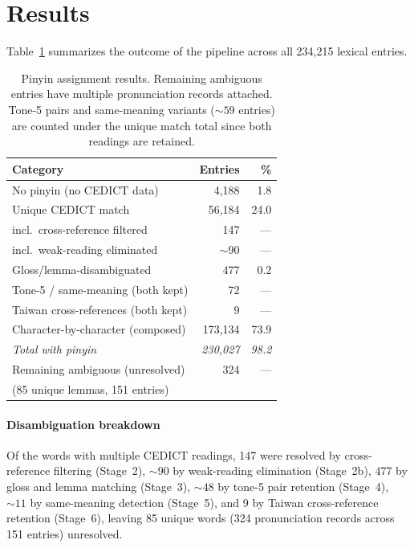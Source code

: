 \documentclass[11pt,a4paper]{article}
\begin{document}
\section{Results}

Table~\ref{tab:results} summarizes the outcome of the pipeline across
all 234,215 lexical entries.

\begin{table}[ht]
\centering
\begin{tabular}{lrr}
  \toprule
  Category & Entries & \% \\
  \midrule
  No pinyin (no CEDICT data) & 4,188 & 1.8 \\
  \midrule
  Unique CEDICT match & 56,184 & 24.0 \\
  \quad incl.\ cross-reference filtered & 147 & --- \\
  \quad incl.\ weak-reading eliminated & ${\sim}90$ & --- \\
  Gloss/lemma-disambiguated & 477 & 0.2 \\
  Tone-5 / same-meaning (both kept) & 72 & --- \\
  Taiwan cross-references (both kept) & 9 & --- \\
  Character-by-character (composed) & 173,134 & 73.9 \\
  \midrule
  \emph{Total with pinyin} & \emph{230,027} & \emph{98.2} \\
  \midrule
  Remaining ambiguous (unresolved) & 324 & --- \\
  \quad (85 unique lemmas, 151 entries) & & \\
  \bottomrule
\end{tabular}
\caption{Pinyin assignment results.  Remaining ambiguous entries have
  multiple pronunciation records attached.  Tone-5 pairs and
  same-meaning variants (${\sim}59$ entries) are counted under the
  unique match total since both readings are retained.}
\label{tab:results}
\end{table}

\paragraph{Disambiguation breakdown}  Of the words with multiple
CEDICT readings, 147 were resolved by cross-reference filtering
(Stage~2), ${\sim}90$ by weak-reading elimination (Stage~2b), 477 by
gloss and lemma matching (Stage~3), ${\sim}48$ by tone-5 pair
retention (Stage~4), ${\sim}11$ by same-meaning detection
(Stage~5), and 9 by Taiwan cross-reference retention (Stage~6),
leaving 85 unique words (324 pronunciation records across 151 entries)
unresolved.
\end{document}
